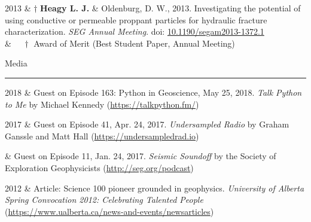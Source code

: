 \documentclass[a4paper, 11pt]{article}
\newcommand{\doi}[1]{doi: \href{https://doi.org/#1}{#1}}
\newcommand{\heading}[1]{
    \begin{minipage}[t]{\textwidth}
    \vspace{0.12cm}
    {\LARGE #1}\\
    \vspace{-0.24cm}
    \hrule
    \end{minipage}
    \vspace{0.05cm}

}
\begin{document}
\begin{entryright}
2013 & $\dagger$ \textbf{Heagy L. J.} \& Oldenburg, D. W., 2013. Investigating the potential of using conductive or permeable proppant particles for hydraulic fracture characterization. \emph{SEG Annual Meeting}. \doi{10.1190/segam2013-1372.1} \\
& $\quad\dagger$ Award of Merit (Best Student Paper, Annual Meeting)
\end{entryright}




\heading{Media}

\begin{entryright}
2018 & Guest on Episode 163: Python in Geoscience, May 25, 2018. \emph{Talk Python to Me} by Michael Kennedy (\href{https://talkpython.fm/episodes/show/163/python-in-geoscience}{https://talkpython.fm/})
\end{entryright}

\begin{entryright}
2017 & Guest on Episode 41, Apr. 24, 2017. \emph{Undersampled Radio} by Graham Ganssle and Matt Hall (\href{https://undersampledrad.io/home/2017/4/inverterizer}{https://undersampledrad.io})
\end{entryright}

\begin{entryright}
 & Guest on Episode 11, Jan. 24, 2017. \emph{Seismic Soundoff} by the Society of Exploration Geophysicists (\href{http://seg.org/podcast/Post/4610/Episode-11-Geophysical-Electromagnetics-2017-DISC}{http://seg.org/podcast})
\end{entryright}

\begin{entryright}
2012 & Article: Science 100 pioneer grounded in geophysics. \emph{University of Alberta Spring Convocation 2012: Celebrating Talented People} (\href{https://www.ualberta.ca/news-and-events/newsarticles/2012/06/science100pioneergroundedingeophysics}{https://www.ualberta.ca/news-and-events/newsarticles})
\end{entryright}
\end{document}
